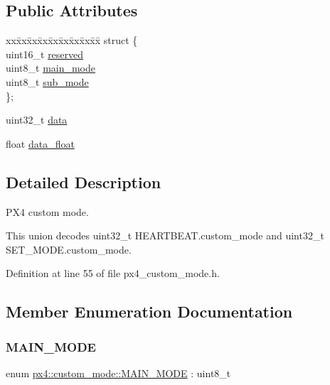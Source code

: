 \subsection*{Public Attributes}
\begin{DoxyCompactItemize}
\item 
\begin{tabbing}
xx\=xx\=xx\=xx\=xx\=xx\=xx\=xx\=xx\=\kill
struct \{\\
\>uint16\_t \mbox{\hyperlink{unionpx4_1_1custom__mode_afe892ba3de4cc366dc7b9d59faf675fe}{reserved}}\\
\>uint8\_t \mbox{\hyperlink{unionpx4_1_1custom__mode_a8ae6c1c52c4eb4592788ccb634892a78}{main\_mode}}\\
\>uint8\_t \mbox{\hyperlink{unionpx4_1_1custom__mode_ade80ea12ee52df667172796a31113beb}{sub\_mode}}\\
\}; \\

\end{tabbing}\item 
uint32\+\_\+t \mbox{\hyperlink{unionpx4_1_1custom__mode_aa8037fb2c1d5c975f1c6350ad3d05015}{data}}
\item 
float \mbox{\hyperlink{unionpx4_1_1custom__mode_a8cd074211bd552fe05fba9f6d880c2e5}{data\+\_\+float}}
\end{DoxyCompactItemize}


\subsection{Detailed Description}
P\+X4 custom mode. 

This union decodes uint32\+\_\+t H\+E\+A\+R\+T\+B\+E\+A\+T.\+custom\+\_\+mode and uint32\+\_\+t S\+E\+T\+\_\+\+M\+O\+D\+E.\+custom\+\_\+mode. 

Definition at line 55 of file px4\+\_\+custom\+\_\+mode.\+h.



\subsection{Member Enumeration Documentation}
\mbox{\label{unionpx4_1_1custom__mode_ad9d2a8e78d275f102f16fa30fd46bc82}} 
\subsubsection{\texorpdfstring{MAIN\_MODE}{MAIN\_MODE}}
{\footnotesize\ttfamily enum \mbox{\hyperlink{unionpx4_1_1custom__mode_ad9d2a8e78d275f102f16fa30fd46bc82}{px4\+::custom\+\_\+mode\+::\+M\+A\+I\+N\+\_\+\+M\+O\+DE}} \+: uint8\+\_\+t}

